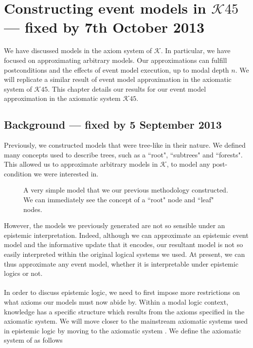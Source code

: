 \section{Constructing event models in $\mathcal{K}45$ --- fixed by 7th October 2013}

We have discussed models in the axiom system of $\mathcal{K}$.
In particular, we have focused on approximating arbitrary models.
Our approximations can fulfill postconditions and the effects of event model execution, up to modal
depth $n$.
We will replicate a similar result of event model approximation in the axiomatic system
of $\mathcal{K}45$.
This chapter details our results for our event model approximation in the axiomatic system
$\mathcal{K}45$.

\subsection{Background --- fixed by 5 September 2013}

Previously, we constructed models that were tree-like in their nature.
We defined many concepts used to describe trees, such as a ``root", ``subtrees" and ``forests".
This allowed us to approximate arbitrary models in $\mathcal{K}$, to model any post-condition we
were interested in.

\begin{figure}[ht!]
\centering
{}
\caption{A very simple model that we our previous methodology constructed.
We can immediately see the concept of a ``root" node and ``leaf" nodes.}
\label{exampleModel}
\end{figure}

However, the models we previously generated are not so sensible under an epistemic interpretation.
Indeed, although we can approximate an epistemic event model and the informative update that it
encodes, our resultant model is not so easily interpreted within the original logical systems we
used.
At present, we can thus approximate any event model, whether it is interpretable under epistemic
logics or not.\\
\\
In order to discuss epistemic logic, we need to first impose more restrictions on what axioms our
models must now abide by.
Within a modal logic context, knowledge has a specific structure which results from the axioms
specified in the axiomatic system.
We will move closer to the mainstream axiomatic systems used in epistemic logic by moving to the
axiomatic system \AXKFF.
We define the axiomatic system of \AXKFF as follows

